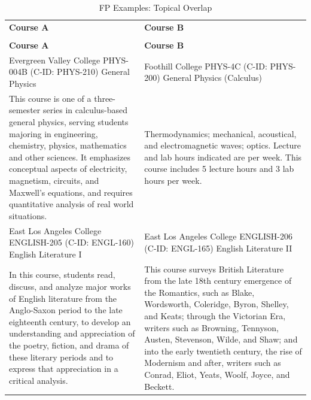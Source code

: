 {
\renewcommand{\arraystretch}{0.5}    
\begin{longtable}{ >{\baselineskip=12pt}p{} >{\baselineskip=12pt}p{} }
\captionsetup{skip=5pt}
\caption{FP Examples: Topical Overlap}\label{tab:fp_overlap_topic}\\
\bottomrule\toprule
\textbf{\textbf{Course A}} & \textbf{\textbf{Course B}} \\
\bottomrule\toprule
\endfirsthead
\caption[]{FP Examples: Topical Overlap}\\
\bottomrule\toprule
\textbf{\textbf{Course A}} & \textbf{\textbf{Course B}} \\
\bottomrule\toprule
\endhead
Evergreen Valley College \newline PHYS-004B (C-ID: PHYS-210) \newline General Physics & Foothill College \newline PHYS-4C (C-ID: PHYS-200) \newline General Physics (Calculus) \\
\midrule
This course is one of a three-semester series in calculus-based general physics, serving students majoring in engineering, chemistry, physics, mathematics and other sciences. It emphasizes conceptual aspects of electricity, magnetism, circuits, and Maxwell's equations, and requires quantitative analysis of real world situations. & Thermodynamics; mechanical, acoustical, and electromagnetic waves; optics. Lecture and lab hours indicated are per week. This course includes 5 lecture hours and 3 lab hours per week. \\
\bottomrule\toprule
East Los Angeles College \newline ENGLISH-205 (C-ID: ENGL-160) \newline English Literature I & East Los Angeles College \newline ENGLISH-206 (C-ID: ENGL-165) \newline English Literature II \\
\midrule
In this course, students read, discuss, and analyze major works of English literature from the Anglo-Saxon period to the late eighteenth century, to develop an understanding and appreciation of the poetry, fiction, and drama of these literary periods and to express that appreciation in a critical analysis. & This course surveys British Literature from the late 18th century emergence of the Romantics, such as Blake, Wordsworth, Coleridge, Byron, Shelley, and Keats; through the Victorian Era, writers such as Browning, Tennyson, Austen, Stevenson, Wilde, and Shaw; and into the early twentieth century, the rise of Modernism and after, writers such as Conrad, Eliot, Yeats, Woolf, Joyce, and Beckett. \\

\end{longtable}}
